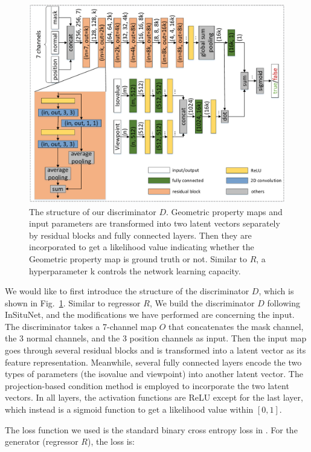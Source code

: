 \documentclass[journal]{vgtc}                %
\begin{document}
\begin{figure}
  \centering
  \includegraphics[width=1\linewidth]{discriminator}
  \caption{The structure of our discriminator $D$. Geometric property maps and input parameters are transformed into two latent vectors separately by residual blocks and fully connected layers. Then they are incorporated to get a likelihood value indicating whether the Geometric property map is ground truth or not. Similar to $R$, a hyperparameter k controls the network learning capacity. }
  \label{fig:discriminator}
\end{figure}

We would like to first introduce the structure of the discriminator $D$, which is shown in Fig.~\ref{fig:discriminator}. Similar to regressor $R$, We build the discriminator $D$ following InSituNet, and the modifications we have performed are concerning the input. The discriminator takes a 7-channel map $O$ that concatenates the mask channel, the 3 normal channels, and the 3 position channels as input. Then the input map goes through several residual blocks and is transformed into a latent vector as its feature representation. Meanwhile, several fully connected layers encode the two types of parameters (the isovalue and viewpoint) into another latent vector. The projection-based condition method \cite{miyato2018cgans} is employed to incorporate the two latent vectors. In all layers, the activation functions are ReLU except for the last layer, which instead is a sigmoid function to get a likelihood value within $[0, 1]$.

The loss function we used is the standard binary cross entropy loss in \cite{goodfellow2014generative}. For the generator (regressor $R$), the loss is:
\end{document}
